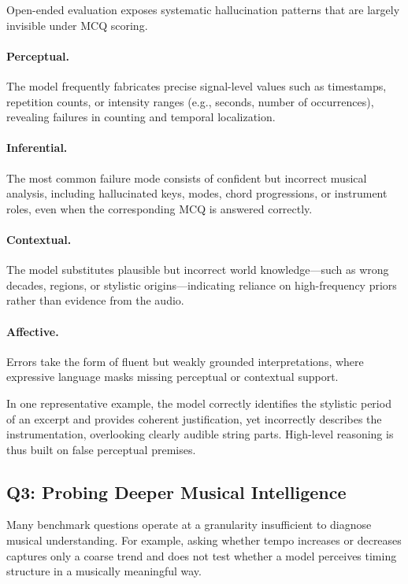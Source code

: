 \documentclass[conference,a4paper]{APSIPA2026}
\begin{document}
Open-ended evaluation exposes systematic hallucination patterns that are largely invisible under MCQ scoring.

\paragraph{Perceptual.}
The model frequently fabricates precise signal-level values such as timestamps, repetition counts, or intensity ranges (e.g., seconds, number of occurrences), revealing failures in counting and temporal localization.

\paragraph{Inferential.}
The most common failure mode consists of confident but incorrect musical analysis, including hallucinated keys, modes, chord progressions, or instrument roles, even when the corresponding MCQ is answered correctly.

\paragraph{Contextual.}
The model substitutes plausible but incorrect world knowledge—such as wrong decades, regions, or stylistic origins—indicating reliance on high-frequency priors rather than evidence from the audio.

\paragraph{Affective.}
Errors take the form of fluent but weakly grounded interpretations, where expressive language masks missing perceptual or contextual support.

In one representative example, the model correctly identifies the stylistic period of an excerpt and provides coherent justification, yet incorrectly describes the instrumentation, overlooking clearly audible string parts. High-level reasoning is thus built on false perceptual premises.

\subsection{Q3: Probing Deeper Musical Intelligence}

Many benchmark questions operate at a granularity insufficient to diagnose musical understanding. For example, asking whether tempo increases or decreases captures only a coarse trend and does not test whether a model perceives timing structure in a musically meaningful way.
\end{document}
